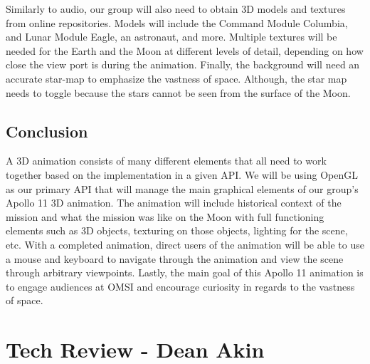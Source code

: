 \documentclass[onecolumn, draftclsnofoot,10pt, compsoc]{IEEEtran}
\begin{document}
    Similarly to audio, our group will also need to obtain 3D models and textures from online repositories. Models will include the Command Module Columbia, and Lunar Module Eagle, an astronaut, and more. Multiple textures will be needed for the Earth and the Moon at different levels of detail, depending on how close the view port is during the animation. Finally, the background will need an accurate star-map to emphasize the vastness of space. Although, the star map needs to toggle because the stars cannot be seen from the surface of the Moon. 
    
\subsection{Conclusion}
A 3D animation consists of many different elements that all need to work together based on the implementation in a given API. We will be using OpenGL as our primary API that will manage the main graphical elements of our group's Apollo 11 3D animation. The animation will include historical context of the mission and what the mission was like on the Moon with full functioning elements such as 3D objects, texturing on those objects, lighting for the scene, etc. With a completed animation, direct users of the animation will be able to use a mouse and keyboard to navigate through the animation and view the scene through arbitrary viewpoints. Lastly, the main goal of this Apollo 11 animation is to engage audiences at OMSI and encourage curiosity in regards to the vastness of space. 

\section{Tech Review - Dean Akin}
\end{document}
